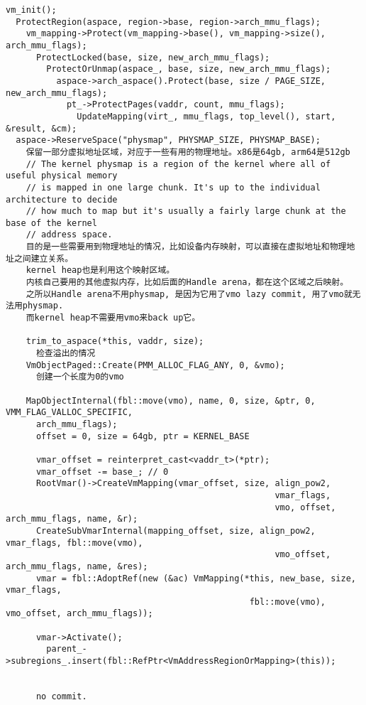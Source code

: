 \begin{verbatim}
vm_init();
  ProtectRegion(aspace, region->base, region->arch_mmu_flags);
    vm_mapping->Protect(vm_mapping->base(), vm_mapping->size(), arch_mmu_flags);
      ProtectLocked(base, size, new_arch_mmu_flags);
        ProtectOrUnmap(aspace_, base, size, new_arch_mmu_flags);
          aspace->arch_aspace().Protect(base, size / PAGE_SIZE, new_arch_mmu_flags);
            pt_->ProtectPages(vaddr, count, mmu_flags);
              UpdateMapping(virt_, mmu_flags, top_level(), start, &result, &cm);
  aspace->ReserveSpace("physmap", PHYSMAP_SIZE, PHYSMAP_BASE);
    保留一部分虚拟地址区域，对应于一些有用的物理地址。x86是64gb, arm64是512gb
    // The kernel physmap is a region of the kernel where all of useful physical memory
    // is mapped in one large chunk. It's up to the individual architecture to decide
    // how much to map but it's usually a fairly large chunk at the base of the kernel
    // address space.
    目的是一些需要用到物理地址的情况，比如设备内存映射，可以直接在虚拟地址和物理地址之间建立关系。
    kernel heap也是利用这个映射区域。
    内核自己要用的其他虚拟内存，比如后面的Handle arena，都在这个区域之后映射。
    之所以Handle arena不用physmap, 是因为它用了vmo lazy commit, 用了vmo就无法用physmap.
    而kernel heap不需要用vmo来back up它。

    trim_to_aspace(*this, vaddr, size);
      检查溢出的情况
    VmObjectPaged::Create(PMM_ALLOC_FLAG_ANY, 0, &vmo);  
      创建一个长度为0的vmo

    MapObjectInternal(fbl::move(vmo), name, 0, size, &ptr, 0, VMM_FLAG_VALLOC_SPECIFIC,
      arch_mmu_flags);
      offset = 0, size = 64gb, ptr = KERNEL_BASE

      vmar_offset = reinterpret_cast<vaddr_t>(*ptr);
      vmar_offset -= base_; // 0
      RootVmar()->CreateVmMapping(vmar_offset, size, align_pow2,
                                                     vmar_flags,
                                                     vmo, offset, arch_mmu_flags, name, &r);
      CreateSubVmarInternal(mapping_offset, size, align_pow2, vmar_flags, fbl::move(vmo),
                                                     vmo_offset, arch_mmu_flags, name, &res);
      vmar = fbl::AdoptRef(new (&ac) VmMapping(*this, new_base, size, vmar_flags,
                                                fbl::move(vmo), vmo_offset, arch_mmu_flags));
      
      vmar->Activate();
        parent_->subregions_.insert(fbl::RefPtr<VmAddressRegionOrMapping>(this));
      
      
      no commit.


\end{verbatim}
